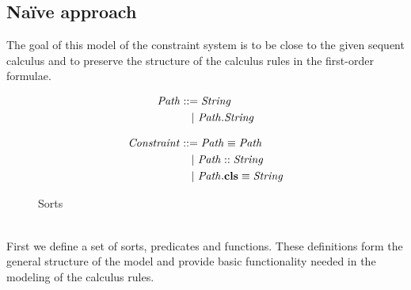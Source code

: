 \subsection{Na\"ive approach}
The goal of this model of the constraint system is to
be close to the given sequent calculus and to preserve
the structure of the calculus rules in the first-order formulae.\\
\begin{figure}[t]
\centering
\begin{subfigure}[c]{0.45\textwidth}
\begin{align*}
\mathit{Path} &::=
     \mathit{String}\\
  &\quad|\ \mathit{Path.String}
\end{align*}
\end{subfigure}
\begin{subfigure}[c]{0.45\textwidth}
\begin{align*}
\mathit{Constraint} &::=
     \mathit{Path} \equiv \mathit{Path}\\
  &\quad|\ \mathit{Path} :: \mathit{String}\\
  &\quad|\ \mathit{Path}.\textbf{cls} \equiv \mathit{String}
\end{align*}
\end{subfigure}
\caption{Sorts}
\label{subfig:axioms-naive-general-sorts}
\end{figure}\\
First we define a set of sorts, predicates and functions.
These definitions form the general structure of the model
and provide basic functionality needed in the modeling of the calculus rules.

